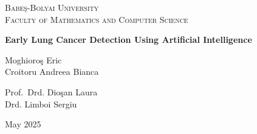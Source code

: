 \documentclass[a4paper,12pt]{article}
\begin{document}

\pagestyle{fancy}
\fancyhf{} %

\fancyhead[C]{\nouppercase{\leftmark}} %
\fancyfoot[C]{\thepage}                %

\renewcommand{\sectionmark}[1]{\markboth{#1}{}} %


\begin{titlepage}
    \centering

    {\scshape\large Babe\c{s}-Bolyai University\\Faculty of Mathematics and Computer Science\par}
    \vspace{4.0cm}

    {\huge\bfseries Early Lung Cancer Detection Using Artificial Intelligence\par}
    \vspace{2.0cm}

    {\Large Moghioro\c{s} Eric \\ Croitoru Andreea Bianca\par}
    \vspace{0.5cm}

    \vfill

    \noindent
    \begin{minipage}[t]{0.48\textwidth}
        \raggedright
        {\large Prof.\ Drd. Dio\c{s}an Laura \\ Drd. Limboi Sergiu}
    \end{minipage}%
    \hfill
    \begin{minipage}[t]{0.48\textwidth}
        \raggedleft
        {\large May 2025}
    \end{minipage}
\end{titlepage}

\end{document}

